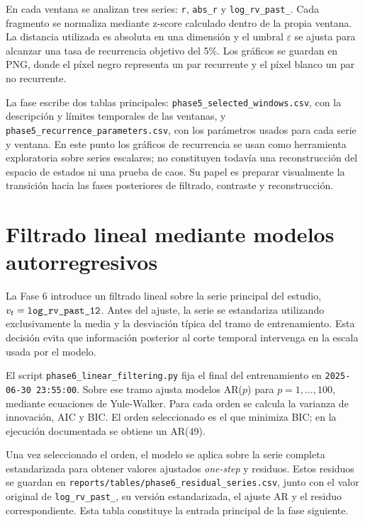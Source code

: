En cada ventana se analizan tres series: \texttt{r}, \texttt{abs\_\allowbreak r} y \texttt{log\_\allowbreak rv\_\allowbreak past\_}. Cada fragmento se normaliza mediante z-score calculado dentro de la propia ventana. La distancia utilizada es absoluta en una dimensión y el umbral \(\varepsilon\) se ajusta para alcanzar una tasa de recurrencia objetivo del 5\%. Los gráficos se guardan en PNG, donde el píxel negro representa un par recurrente y el píxel blanco un par no recurrente.

La fase escribe dos tablas principales: \texttt{phase5\_\allowbreak selected\_\allowbreak windows.csv}, con la descripción y límites temporales de las ventanas, y \texttt{phase5\_\allowbreak recurrence\_\allowbreak parameters.csv}, con los parámetros usados para cada serie y ventana. En este punto los gráficos de recurrencia se usan como herramienta exploratoria sobre series escalares; no constituyen todavía una reconstrucción del espacio de estados ni una prueba de caos. Su papel es preparar visualmente la transición hacia las fases posteriores de filtrado, contraste y reconstrucción.

\section{Filtrado lineal mediante modelos autorregresivos}\label{sec:filtrado-lineal}

La Fase 6 introduce un filtrado lineal sobre la serie principal del estudio, \(v_t = \texttt{log\_\allowbreak rv\_\allowbreak past\_\allowbreak 12}\). Antes del ajuste, la serie se estandariza utilizando exclusivamente la media y la desviación típica del tramo de entrenamiento. Esta decisión evita que información posterior al corte temporal intervenga en la escala usada por el modelo.

El script \texttt{phase6\_\allowbreak linear\_\allowbreak filtering.py} fija el final del entrenamiento en \texttt{2025-06-30 23:55:00}. Sobre ese tramo ajusta modelos AR(\(p\)) para \(p=1,\ldots,100\), mediante ecuaciones de Yule-Walker. Para cada orden se calcula la varianza de innovación, AIC y BIC. El orden seleccionado es el que minimiza BIC; en la ejecución documentada se obtiene un AR(49).

Una vez seleccionado el orden, el modelo se aplica sobre la serie completa estandarizada para obtener valores ajustados \textit{one-step} y residuos. Estos residuos se guardan en \texttt{reports/\allowbreak tables/\allowbreak phase6\_\allowbreak residual\_\allowbreak series.csv}, junto con el valor original de \texttt{log\_\allowbreak rv\_\allowbreak past\_}, su versión estandarizada, el ajuste AR y el residuo correspondiente. Esta tabla constituye la entrada principal de la fase siguiente.

